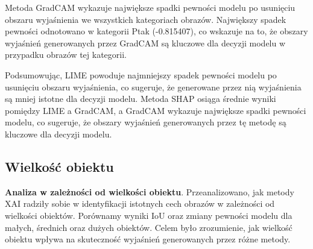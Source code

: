 Metoda GradCAM wykazuje największe spadki pewności modelu po usunięciu obszaru wyjaśnienia we wszystkich kategoriach obrazów.
Największy spadek pewności odnotowano w kategorii Ptak (-0.815407), co wskazuje na to, że obszary wyjaśnień generowanych przez GradCAM są kluczowe dla decyzji modelu w przypadku obrazów tej kategorii.

Podsumowując, LIME powoduje najmniejszy spadek pewności modelu po usunięciu obszaru wyjaśnienia, co sugeruje, że generowane przez nią wyjaśnienia są mniej istotne dla decyzji modelu.
Metoda SHAP osiąga średnie wyniki pomiędzy LIME a GradCAM, a GradCAM wykazuje największe spadki pewności modelu, co sugeruje, że obszary wyjaśnień generowanych przez tę metodę są kluczowe dla decyzji modelu.

\subsection*{Wielkość obiektu}

\textbf{Analiza w zależności od wielkości obiektu}.
Przeanalizowano, jak metody XAI radziły sobie w identyfikacji istotnych cech obrazów w zależności od wielkości obiektów.
Porównamy wyniki IoU oraz zmiany pewności modelu dla małych, średnich oraz dużych obiektów.
Celem było zrozumienie, jak wielkość obiektu wpływa na skuteczność wyjaśnień generowanych przez różne metody.

